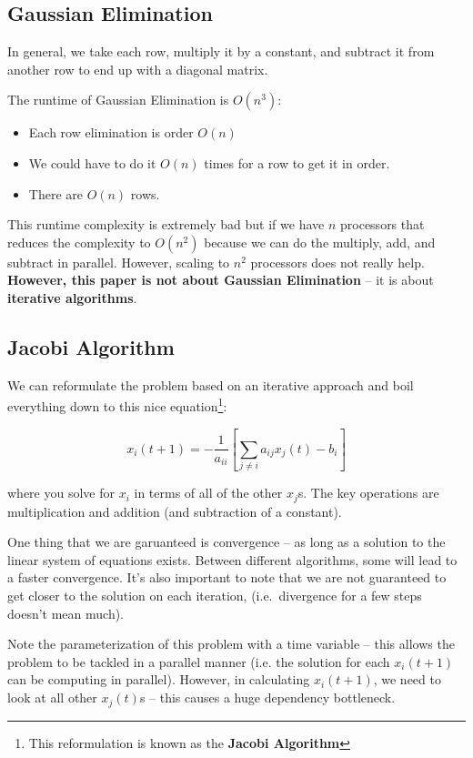 \subsection{Gaussian Elimination}

In general, we take each row, multiply it by a constant, and subtract it from another row to end up with a diagonal matrix. 

The runtime of Gaussian Elimination is \( O (n^3) \):
\begin{itemize}
    \item Each row elimination is order \( O(n) \)
    \item We could have to do it \( O(n) \) times for a row to get it in order.
    \item There are \( O(n) \) rows.
\end{itemize}

This runtime complexity is extremely bad but if we have \( n \) processors that reduces the complexity to \( O(n^2) \) because we can do the multiply, add, and subtract in parallel. However, scaling to \( n^2 \) processors does not really help. \textbf{However, this paper is not about Gaussian Elimination} -- it is about \textbf{iterative algorithms}. 

\subsection{Jacobi Algorithm}

We can reformulate the problem based on an iterative approach and boil everything down to this nice equation\footnote{This reformulation is known as the \textbf{Jacobi Algorithm}}:

\[
x_{i}(t + 1) = -\frac{1}{a_{ii}} [ \sum_{j \neq i} a_{ij} x_{j} (t) - b_{i} ]
\]

where you solve for \( x_{i} \) in terms of all of the other \( x_{j} \)s. The key operations are  multiplication and addition (and subtraction of a constant).

One thing that we are garuanteed is convergence -- as long as a solution to the linear system of equations exists. Between different algorithms, some will lead to a faster convergence. It's also important to note that we are not guaranteed to get closer to the solution on each iteration, (i.e.\ divergence for a few steps doesn't mean much).

Note the parameterization of this problem with a time variable -- this allows the problem to be tackled in a parallel manner (i.e. the solution for each \( x_{i}(t+1) \) can be computing in parallel). However, in calculating \( x_{i}(t+1) \), we need to look at all other \( x_{j} (t)\)s -- this causes a huge dependency bottleneck. 

